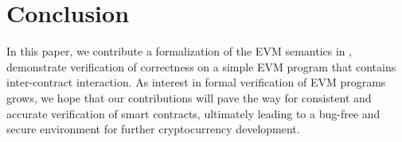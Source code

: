 \section{Conclusion}
In this paper, we contribute a formalization of the EVM semantics in \K{},
demonstrate verification of correctness on a simple EVM program that contains
inter-contract interaction. As interest in formal verification of EVM programs
grows, we hope that our contributions will pave the way for consistent and
accurate verification of smart contracts, ultimately leading to a bug-free and
secure environment for further cryptocurrency development.
